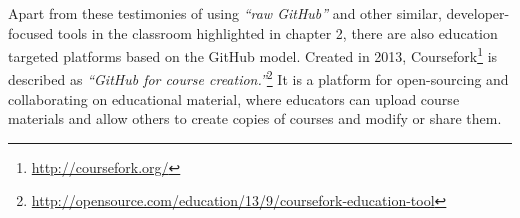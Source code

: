 

Apart from these testimonies of using \textit{``raw GitHub''} and other similar, developer-focused tools in the classroom highlighted in chapter 2, there are also education targeted platforms based on the GitHub model. Created in 2013, Coursefork\footnote{\url{http://coursefork.org/}} is described as \textit{``GitHub for course creation.''}\footnote{\url{http://opensource.com/education/13/9/coursefork-education-tool}} It is a platform for open-sourcing and collaborating on educational material, where educators can upload course materials and allow others to create copies of courses and modify or share them.

